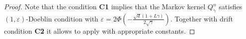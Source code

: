 \documentclass[leqno,11pt,a4paper]{article}
\begin{document}
\begin{proof} Note that the condition {\bf C1} implies that the Markov kernel $Q^n_\gamma$ satisfies $(1,\varepsilon)$-Doeblin condition with $\varepsilon = 2\Phi\left(-\frac{\sqrt{d}(1+L\gamma)}{2\sqrt{\gamma}}\right)$. Together with drift condition {\bf C2} it allows to apply \cite[Theorem~19.4.1]{douc:moulines:priouret:soulier:2018} with appropriate constants. 
\end{proof}



\end{document}
